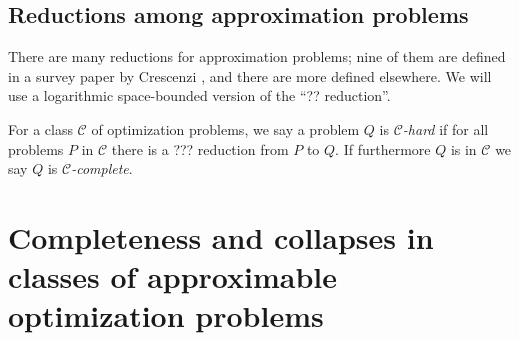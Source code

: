 \documentclass[]{article}
\newcommand{\APr}{\leq_{AP}^{L}}
\begin{document}
\subsection{Reductions among approximation problems}

There are many reductions for approximation problems; nine of them are defined in a survey paper by Crescenzi \cite{crescenzi97}, and there are more defined elsewhere.
We will use a logarithmic space-bounded version of the ``?? reduction''.%



For a class $\mathcal{C}$ of optimization problems, we say a problem $Q$ is \emph{$\mathcal{C}$-hard} if for all problems $P$ in $\mathcal{C}$ there is a ??? reduction from $P$ to $Q$.
If furthermore $Q$ is in $\mathcal{C}$ we say $Q$ is \emph{$\mathcal{C}$-complete}.

\section{Completeness and collapses in classes of approximable optimization problems}
\end{document}
